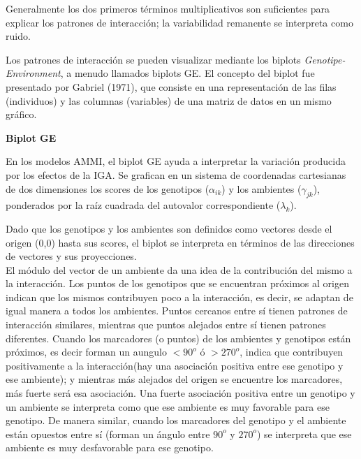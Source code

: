 Generalmente los dos primeros términos multiplicativos son suficientes para explicar los patrones de interacción; la variabilidad remanente se interpreta como ruido. 

Los patrones de interacción se pueden visualizar mediante los biplots \emph{Genotipe-Environment}, a menudo llamados biplots GE. El concepto del biplot fue presentado por Gabriel (1971), que consiste en una representación de las filas (individuos) y las columnas (variables) de una matriz de datos en un mismo gráfico. 

\textbf{Biplot GE}

En los modelos AMMI, el biplot GE ayuda a interpretar la variación producida por los efectos de la IGA. Se grafican en un sistema de coordenadas cartesianas de dos dimensiones los scores de los genotipos ($\alpha_{ik}$) y los ambientes ($\gamma_{jk}$), ponderados por la raíz cuadrada del autovalor correspondiente ($\lambda_k$).

Dado que los genotipos y los ambientes son definidos como vectores desde el origen (0,0) hasta sus scores, el biplot se interpreta en términos de las direcciones de vectores y sus proyecciones.\\

El módulo del vector de un ambiente da una idea de la contribución del mismo a la interacción. Los puntos de los genotipos que se encuentran próximos al origen indican que los mismos contribuyen poco a la interacción, es decir, se adaptan de igual manera a todos los ambientes. Puntos cercanos entre sí tienen patrones de interacción similares, mientras que puntos alejados entre sí tienen patrones diferentes. Cuando los marcadores (o puntos) de los ambientes y genotipos están próximos, es decir forman un aungulo $< 90^o$ ó $> 270^o$, indica que contribuyen positivamente a la interacción(hay una asociación positiva entre ese genotipo y ese ambiente); y mientras más alejados del origen se encuentre los marcadores, más fuerte será esa asociación. Una fuerte asociación positiva entre un genotipo y un ambiente se interpreta como que ese ambiente es muy favorable para ese genotipo. De manera similar, cuando los marcadores del genotipo y el ambiente están opuestos entre sí (forman un ángulo entre $90^o$ y $270^o$) se interpreta que ese ambiente es muy desfavorable para ese genotipo.\\


